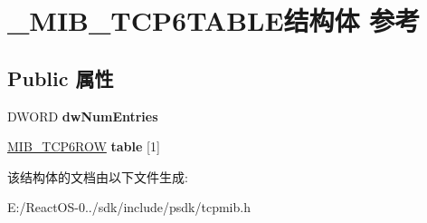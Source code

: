 \hypertarget{struct___m_i_b___t_c_p6_t_a_b_l_e}{}\section{\+\_\+\+M\+I\+B\+\_\+\+T\+C\+P6\+T\+A\+B\+L\+E结构体 参考}
\label{struct___m_i_b___t_c_p6_t_a_b_l_e}
\subsection*{Public 属性}
\begin{DoxyCompactItemize}
\item 
\mbox{\label{struct___m_i_b___t_c_p6_t_a_b_l_e_a1bcee9a60baf65f79cf74a183eab5865}} 
D\+W\+O\+RD {\bfseries dw\+Num\+Entries}
\item 
\mbox{\label{struct___m_i_b___t_c_p6_t_a_b_l_e_a8574b930b2f12303c54566249004477d}} 
\hyperlink{struct___m_i_b___t_c_p6_r_o_w}{M\+I\+B\+\_\+\+T\+C\+P6\+R\+OW} {\bfseries table} \mbox{[}1\mbox{]}
\end{DoxyCompactItemize}


该结构体的文档由以下文件生成\+:\begin{DoxyCompactItemize}
\item 
E\+:/\+React\+O\+S-\/0../sdk/include/psdk/tcpmib.\+h\end{DoxyCompactItemize}
